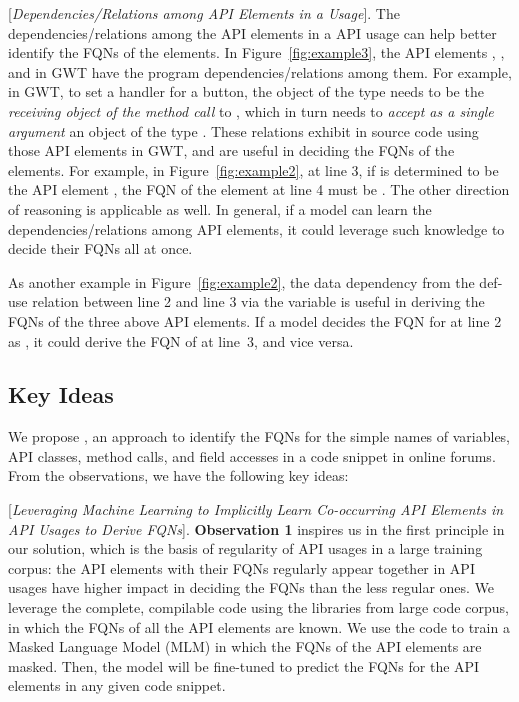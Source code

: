 \vspace{2pt}
 [{\em Dependencies/Relations among API
    Elements in a Usage}]. The dependencies/relations among the API
elements in a API usage can help better identify the FQNs of the
elements.  In Figure~\ref{fig:example3}, the API elements
, , and  in GWT
have the program dependencies/relations among them. For example, in
GWT, to set a handler for a button, the object of the type
 needs to be the {\em receiving object of the method
  call} to , which in turn needs to {\em accept
  as a single argument} an object of the type .
These relations exhibit in source code using those API elements in
GWT, and are useful in deciding the FQNs of the elements. For example,
in Figure~\ref{fig:example2}, at line 3, if  is
determined to be the API element
, the
FQN of the element at line 4 must be
.  The
other direction of reasoning is applicable as well. In general, if a
model can learn the dependencies/relations among API elements, it
could leverage such knowledge to decide their FQNs all at once.


As another example in Figure~\ref{fig:example2}, the data dependency
from the def-use relation between line 2 and line 3 via the variable
 is useful in deriving the FQNs of the three above API
elements. If a model decides the FQN for  at line 2 as
, it could
derive the FQN of  at line~3, and vice versa.


\subsection{Key Ideas}
\label{sec:key}

We propose {\tool}, an approach to identify the FQNs for the simple
names of variables, API classes, method calls, and field accesses in a
code snippet in online forums. From the observations, we have the
following key ideas:

\vspace{2pt}
 [{\em Leveraging Machine Learning to
    Implicitly Learn Co-occurring API Elements in API Usages to Derive
    FQNs}]. {\bf Observation 1} inspires us in the first principle in
our solution, which is the basis of regularity of API usages in a
large training corpus: the API elements with their FQNs regularly
appear together in API usages have higher impact in deciding the FQNs than
the less regular ones. We leverage the complete, compilable code using
the libraries from large code corpus, in which the FQNs of all the API
elements are known. We use the code to train a Masked Language Model
(MLM) in which the FQNs of the API elements are masked. Then, the
model will be fine-tuned to predict the FQNs for the API elements in
any given code snippet.

